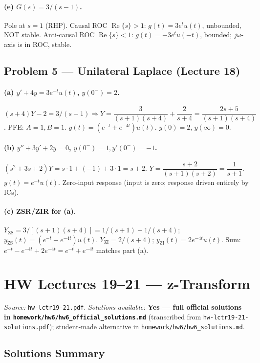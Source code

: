 \documentclass[11pt]{article}
\newcommand{\Real}{\operatorname{Re}}
\begin{document}
\paragraph{(e) $G(s) = 3/(s-1)$.} Pole at $s=1$ (RHP).
Causal ROC $\Real\{s\}>1$: $g(t) = 3 e^{t}u(t)$, unbounded, NOT stable.
Anti-causal ROC $\Real\{s\}<1$: $g(t) = -3e^{t}u(-t)$, bounded; $j\omega$-axis is in ROC, stable.

\subsection{Problem 5 --- Unilateral Laplace (Lecture 18)}

\paragraph{(a) $y' + 4y = 3e^{-t}u(t)$, $y(0^-) = 2$.}
$(s+4)Y - 2 = 3/(s+1) \Rightarrow Y = \dfrac{3}{(s+1)(s+4)} + \dfrac{2}{s+4} = \dfrac{2s+5}{(s+1)(s+4)}$. PFE: $A=1, B=1$. $y(t) = (e^{-t}+e^{-4t})u(t)$. $y(0)=2$, $y(\infty)=0$.

\paragraph{(b) $y''+3y'+2y=0$, $y(0^-)=1, y'(0^-)=-1$.}
$(s^2+3s+2) Y = s\cdot 1 + (-1) + 3\cdot 1 = s+2$. $Y = \dfrac{s+2}{(s+1)(s+2)} = \dfrac{1}{s+1}$. $y(t) = e^{-t}u(t)$. Zero-input response (input is zero; response driven entirely by ICs).

\paragraph{(c) ZSR/ZIR for (a).}
$Y_{\text{ZS}} = 3/[(s+1)(s+4)] = 1/(s+1) - 1/(s+4)$; $y_{\text{ZS}}(t) = (e^{-t}-e^{-4t})u(t)$.
$Y_{\text{ZI}} = 2/(s+4)$; $y_{\text{ZI}}(t) = 2e^{-4t}u(t)$.
Sum: $e^{-t} - e^{-4t} + 2e^{-4t} = e^{-t} + e^{-4t}$ matches part (a).

\section{HW Lectures 19--21 --- z-Transform}
\emph{Source:} \texttt{hw-lctr19-21.pdf}. \emph{Solutions available:} \textbf{Yes --- full official solutions in \texttt{homework/hw6/hw6\_official\_solutions.md}} (transcribed from \texttt{hw-lctr19-21-solutions.pdf}); student-made alternative in \texttt{homework/hw6/hw6\_solutions.md}.

\subsection*{Solutions Summary}
\end{document}
